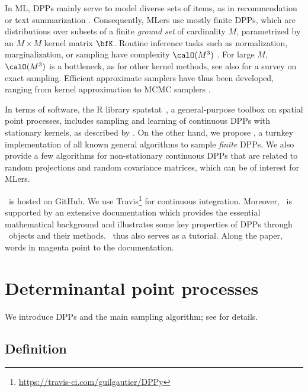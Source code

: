 \documentclass[twoside,11pt]{article}
\begin{document}
  In ML, DPPs mainly serve to model diverse sets of items, as in recommendation \citep{KaDeKo16, GaPaKo16} or text summarization \citep{DuBa18}.
  Consequently, MLers  use mostly finite DPPs, which are distributions over subsets of a finite \emph{ground set} of cardinality $M$, parametrized by an $M\times M$ kernel matrix $\bfK$.
  Routine inference tasks such as normalization, marginalization, or sampling have complexity $\calO(M^3)$ \citep{KuTa12}.
  For large $M$, $\calO(M^3)$ is a bottleneck, as for other kernel methods, see also \citet{TrBaAm18} for a survey on exact sampling.
  Efficient approximate samplers have thus been developed, ranging from kernel approximation \citep{AKFT13} to MCMC samplers \citep{AnGhRe16, LiJeSr16c, GaBaVa17}.

  In terms of software, the R library \textsf{spatstat}\ \citep{BaTu05}, a general-purpose toolbox on spatial point processes, includes sampling and learning of continuous DPPs with stationary kernels, as described by \citet{LaMoRu15}.
  On the other hand, we propose \DPPy, a turnkey implementation of all known general algorithms to sample \emph{finite} DPPs.
  We also provide a few algorithms for non-stationary continuous DPPs that are related to random projections and random covariance matrices, which can be of interest for MLers.

  \DPPy\ is hosted on GitHub. We use \setcounter{footnote}{5}Travis\footnote{\url{https://travis-ci.com/guilgautier/DPPy}} for continuous integration.
  Moreover, \DPPy\ is supported by an extensive documentation which provides the essential mathematical background and illustrates some key properties of DPPs through \DPPy\ objects and their methods.
  \DPPy\ thus also serves as a tutorial.
  Along the paper, words in magenta point to the documentation.


\section{Determinantal point processes} %
\label{sec:determinantal_point_processes}

	We introduce DPPs and the main sampling algorithm; see \citet{HKPV06} for details.

  \subsection{Definition} %
  \label{sub:definition}
\end{document}
